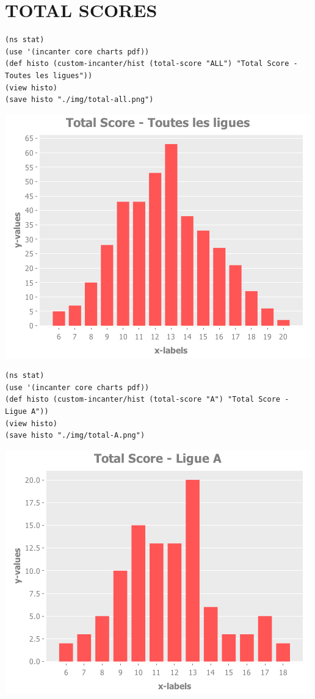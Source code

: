 \documentclass[11pt]{article}
\author{Chrislain}
\date{\today}
\title{}
\begin{document}
\tableofcontents

\section{TOTAL SCORES}
\label{sec:org9169166}

\begin{verbatim}
(ns stat)
(use '(incanter core charts pdf))
(def histo (custom-incanter/hist (total-score "ALL") "Total Score - Toutes les ligues"))
(view histo)
(save histo "./img/total-all.png")
\end{verbatim}

\includegraphics[width=.9\linewidth]{./img/total-all.png}


\begin{verbatim}
(ns stat)
(use '(incanter core charts pdf))
(def histo (custom-incanter/hist (total-score "A") "Total Score - Ligue A"))
(view histo)
(save histo "./img/total-A.png")
\end{verbatim}

\includegraphics[width=.9\linewidth]{./img/total-A.png}
\end{document}
